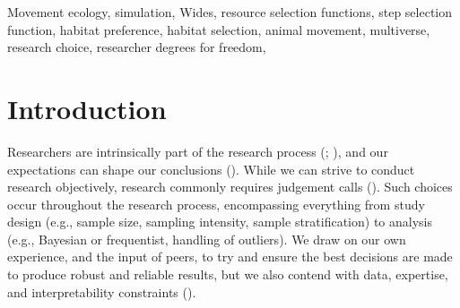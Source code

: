 \documentclass[10pt,a4paper]{article}
\begin{document}
Movement ecology, simulation, Wides, resource selection functions, step selection function, habitat preference, habitat selection, animal movement, multiverse, research choice, researcher degrees for freedom,

\clearpage
\pagestyle{fancy}

\section{Introduction}\label{introduction}

Researchers are intrinsically part of the research process (; ), and our expectations can shape our conclusions ().
While we can strive to conduct research objectively, research commonly requires judgement calls ().
Such choices occur throughout the research process, encompassing everything from study design (e.g., sample size, sampling intensity, sample stratification) to analysis (e.g., Bayesian or frequentist, handling of outliers).
We draw on our own experience, and the input of peers, to try and ensure the best decisions are made to produce robust and reliable results, but we also contend with data, expertise, and interpretability constraints ().
\end{document}
